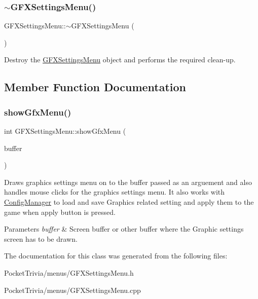 \subsubsection{\texorpdfstring{$\sim$GFXSettingsMenu()}{~GFXSettingsMenu()}}
{\footnotesize\ttfamily G\+F\+X\+Settings\+Menu\+::$\sim$\+G\+F\+X\+Settings\+Menu (\begin{DoxyParamCaption}{ }\end{DoxyParamCaption})}



Destroy the \mbox{\hyperlink{class_g_f_x_settings_menu}{G\+F\+X\+Settings\+Menu}} object and performs the required clean-\/up. 



\subsection{Member Function Documentation}
\mbox{\label{class_g_f_x_settings_menu_aa2b91fbdb68ec4bf0ed8816ad7b845ad}} 
\subsubsection{\texorpdfstring{showGfxMenu()}{showGfxMenu()}}
{\footnotesize\ttfamily int G\+F\+X\+Settings\+Menu\+::show\+Gfx\+Menu (\begin{DoxyParamCaption}\item[{B\+I\+T\+M\+AP $\ast$}]{buffer }\end{DoxyParamCaption})}



Draws graphics settings menu on to the buffer passed as an arguement and also handles mouse clicks for the graphics settings menu. It also works with \mbox{\hyperlink{class_config_manager}{Config\+Manager}} to load and save Graphics related setting and apply them to the game when apply button is pressed. 


\begin{DoxyParams}{Parameters}
{\em buffer} & Screen buffer or other buffer where the Graphic settings screen has to be drawn. \\
\hline
\end{DoxyParams}


The documentation for this class was generated from the following files\+:\begin{DoxyCompactItemize}
\item 
Pocket\+Trivia/menus/G\+F\+X\+Settings\+Menu.\+h\item 
Pocket\+Trivia/menus/G\+F\+X\+Settings\+Menu.\+cpp\end{DoxyCompactItemize}
